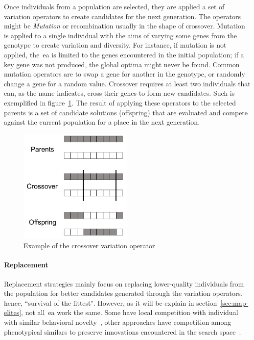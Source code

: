 Once individuals from a population are selected, they are applied a set of variation operators to create candidates for the next generation. The operators might be \emph{Mutation} or recombination usually in the shape of crossover. Mutation is applied to a single individual with the aims of varying some genes from the genotype to create variation and diversity. For instance, if mutation is not applied, the~\acrshort{ea} is limited to the genes encountered in the initial population; if a key gene was not produced, the global optima might never be found. Common mutation operators are to swap a gene for another in the genotype, or randomly change a gene for a random value. Crossover requires at least two individuals that can, as the name indicates, cross their genes to form new candidates. Such is exemplified in figure~\ref{fig:crossoverEX}. The result of applying these operators to the selected parents is a set of candidate solutions (offspring) that are evaluated and compete against the current population for a place in the next generation.

\begin{figure}
\centerline{\includegraphics[width=0.5\textwidth]{figures/EC/crossover-example-bw.png}}
\caption{Example of the crossover variation operator
} \label{fig:crossoverEX}
\end{figure}

\paragraph{Replacement}

Replacement strategies mainly focus on replacing lower-quality individuals from the population for better candidates generated through the variation operators, hence, ``survival of the fittest". However, as it will be explain in section~\ref{sec:map-elites}, not all~\acrshort{ea} work the same. Some have local competition with individual with similar behavioral novelty~\cite{Lehman2011-NSLC}, other approaches have competition among phenotypical similars to preserve innovations encountered in the search space~\cite{Stanley2002-NEAT}.

